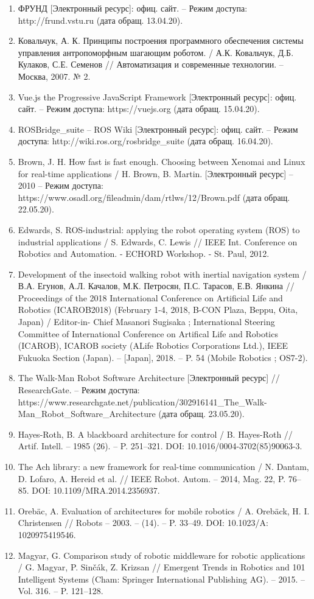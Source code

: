 \begin{enumerate}[label={\arabic*.},labelsep=2.4em,itemindent=0pt,leftmargin=*,align=right]
	\item ФРУНД [Электронный ресурс]: офиц. сайт. – Режим доступа: http://frund.vstu.ru (дата обращ. 13.04.20).
	\item Ковальчук, А. К. Принципы построения программного обеспечения системы управления антропоморфным шагающим роботом. / А.К. Ковальчук, Д.Б. Кулаков, С.Е. Семенов // Автоматизация и современные технологии. – Москва, 2007. № 2.
	\item Vue.js the Progressive JavaScript Framework [Электронный ресурс]: офиц. сайт. – Режим доступа: https://vuejs.org (дата обращ. 15.04.20).
	\item ROSBridge\_suite – ROS Wiki [Электронный ресурс]: офиц. сайт. – Режим доступа: http://wiki.ros.org/rosbridge\_suite (дата обращ. 16.04.20).
	\item Brown, J. H. How fast is fast enough. Choosing between Xenomai and Linux for real-time applications / H. Brown, B. Martin. [Электронный ресурс] – 2010 – Режим доступа: https://www.osadl.org/fileadmin/dam/rtlws/12/Brown.pdf (дата обращ. 22.05.20).
	\item Edwards, S. ROS-industrial: applying the robot operating system (ROS) to industrial applications / S. Edwards, C. Lewis // IEEE Int. Conference on Robotics and Automation. - ECHORD Workshop. - St. Paul, 2012.
	\item Development of the insectoid walking robot with inertial navigation system / В.А. Егунов, А.Л. Качалов, М.К. Петросян, П.С. Тарасов, Е.В. Янкина // Proceedings of the 2018 International Conference on Artificial Life and Robotics (ICAROB2018) (February 1-4, 2018, B-CON Plaza, Beppu, Oita, Japan) / Editor-in- Chief Masanori Sugisaka ; International Steering Committee of International Conference on Artifical Life and Robotics (ICAROB), ICAROB society (ALife Robotics Corporations Ltd.), IEEE Fukuoka Section (Japan). – [Japan], 2018. – P. 54 (Mobile Robotics ; OS7-2).
	\item The Walk-Man Robot Software Architecture [Электронный ресурс] // ResearchGate. – Режим доступа: https://www.researchgate.net/publication/302916141\_The\_Walk-Man\_Robot\_Software\_Architecture (дата обращ. 23.05.20).
 	\item Hayes-Roth, B. A blackboard architecture for control / B. Hayes-Roth // Artif. Intell. – 1985 (26). – P. 251–321. DOI: 10.1016/0004-3702(85)90063-3.
 	\item The Ach library: a new framework for real-time communication / N. Dantam, D. Lofaro, A. Hereid et al. // IEEE Robot. Autom. – 2014, Mag. 22, P. 76–85. DOI: 10.1109/MRA.2014.2356937.
 	\item Orebäc, A. Evaluation of architectures for mobile robotics / A. Orebäck, H. I. Christensen // Robots – 2003. – (14). – P. 33–49. DOI: 10.1023/A: 1020975419546.
 	\item Magyar, G. Comparison study of robotic middleware for robotic applications / G. Magyar, P. Sinčák, Z. Krizsan // Emergent Trends in Robotics and 101 Intelligent Systems (Cham: Springer International Publishing AG). – 2015. – Vol. 316. – P. 121–128.
\end{enumerate}